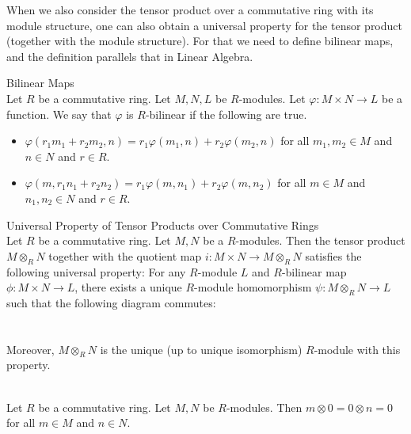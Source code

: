 \documentclass[a4paper]{article}
\begin{document}
When we also consider the tensor product over a commutative ring with its module structure, one can also obtain a universal property for the tensor product (together with the module structure). For that we need to define bilinear maps, and the definition parallels that in Linear Algebra. 

\begin{defn}{Bilinear Maps}{}\\
Let $R$ be a commutative ring. Let $M,N,L$ be $R$-modules. Let $\varphi:M\times N\to L$ be a function. We say that $\varphi$ is $R$-bilinear if the following are true. 
\begin{itemize}
\item $\varphi(r_1m_1+r_2m_2,n)=r_1\varphi(m_1,n)+r_2\varphi(m_2,n)$ for all $m_1,m_2\in M$ and $n\in N$ and $r\in R$. 
\item $\varphi(m,r_1n_1+r_2n_2)=r_1\varphi(m,n_1)+r_2\varphi(m,n_2)$ for all $m\in M$ and $n_1,n_2\in N$ and $r\in R$. 
\end{itemize}
\end{defn}

\begin{prp}{Universal Property of Tensor Products over Commutative Rings}{}\\
Let $R$ be a commutative ring. Let $M,N$ be a $R$-modules. Then the tensor product $M\otimes_RN$ together with the quotient map $i:M\times N\to M\otimes_RN$ satisfies the following universal property: For any $R$-module $L$ and $R$-bilinear map $\phi:M\times N\to L$, there exists a unique $R$-module homomorphism $\psi:M\otimes_RN\to L$ such that the following diagram commutes: \\~\\
\\
Moreover, $M\otimes_RN$ is the unique (up to unique isomorphism) $R$-module with this property. 
\end{prp}

\begin{eg}{}{}\\
Let $R$ be a commutative ring. Let $M,N$ be $R$-modules. Then $m\otimes 0=0\otimes n=0$ for all $m\in M$ and $n\in N$. 
\end{eg}
\end{document}
